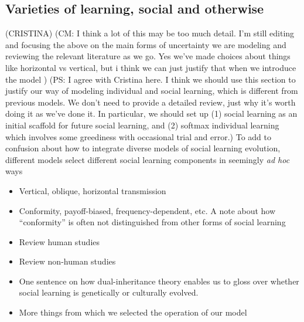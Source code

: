 \documentclass[letterpaper,11.5pt]{scrartcl}
\newcommand{\cm}[1]{{\textcolor{mypurple} {({\tiny CM:} #1)}}}
\newcommand{\ps}[1]{{\textcolor{mygreen} {({\tiny PS:} #1)}}}
\begin{document}

\subsection{Varieties of learning, social and otherwise} (CRISTINA) 
\cm{I think a lot of this may be too much detail. I'm still editing and focusing the above on the main forms of uncertainty we are modeling and reviewing the relevant literature as we go. Yes we've made choices about things like horizontal vs vertical, but i think we can just justify that when we introduce the model }
\ps{I agree with Cristina here. I think we should use this section to justify our way of modeling individual and social learning, which is different from previous models. We don't need to provide a detailed review, just why it's worth doing it as we've done it. In particular, we should set up (1) social learning as an initial scaffold for future social learning, and (2) softmax individual learning which involves some greediness with occasional trial and error.}
To add to confusion about how to integrate diverse models of social learning
evolution, different models select different social learning components in
seemingly \emph{ad hoc} ways 
\begin{itemize}
  \item 
    Vertical, oblique, horizontal transmission
  \item
    Conformity, payoff-biased, frequency-dependent, etc. A note about how
    ``conformity'' is often not distinguished from other forms of social learning
  \item
    Review human studies
  \item
    Review non-human studies~\cite{Leris2016,Aplin2017,Avargues-Weber2018,Baracchi2018}
  \item
    One sentence on how dual-inheritance theory enables us to gloss over whether
    social learning is genetically or culturally evolved.
  \item
    More things from which we selected the operation of our model
\end{itemize}
\end{document}
